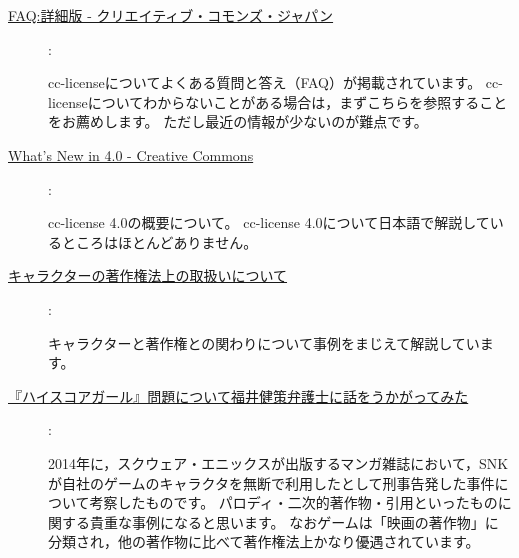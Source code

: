 \documentclass{ltjsarticle}
\begin{document}
\begin{description}

\item[\href{http://creativecommons.jp/faq/detail/}{FAQ:詳細版 - クリエイティブ・コモンズ・ジャパン}] :\par
    cc-licenseについてよくある質問と答え（FAQ）が掲載されています。
    cc-licenseについてわからないことがある場合は，まずこちらを参照することをお薦めします。
    ただし最近の情報が少ないのが難点です。

\item[\href{https://creativecommons.org/Version4}{What’s New in 4.0 - Creative Commons}] :\par
    cc-license 4.0の概要について。
    cc-license 4.0について日本語で解説しているところはほとんどありません。

\item[\href{http://onm-tm.jp/news/69}{キャラクターの著作権法上の取扱いについて}] :\par
    キャラクターと著作権との関わりについて事例をまじえて解説しています。

\item[\href{http://otapol.jp/2014/09/post-1542.html}{『ハイスコアガール』問題について福井健策弁護士に話をうかがってみた}] :\par
    2014年に，スクウェア・エニックスが出版するマンガ雑誌において，SNKが自社のゲームのキャラクタを無断で利用したとして刑事告発した事件について考察したものです。
    パロディ・二次的著作物・引用といったものに関する貴重な事例になると思います。
    なおゲームは「映画の著作物」に分類され，他の著作物に比べて著作権法上かなり優遇されています。

\end{description}

\nocite{Book:CCJP}\nocite{Book:NAWA-CR2}\nocite{Book:NOGUCHI-COPY}\nocite{Book:CHEN-FC}
\printbibliography[title=参考図書]
\end{document}
